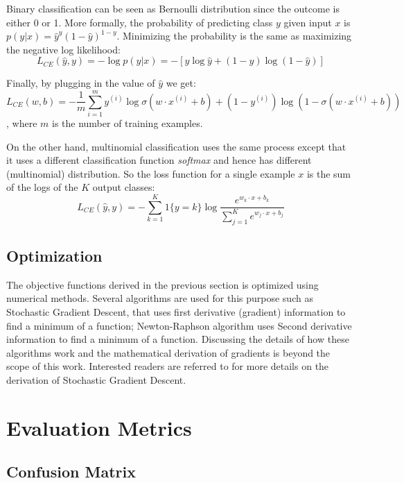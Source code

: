 Binary classification can be seen as Bernoulli distribution since the outcome is either 0 or 1. More formally, the probability of predicting class $y$ given input $x$ is  $p ( y | x ) = \hat { y } ^ { y } ( 1 - \hat { y } ) ^ { 1 - y }$. Minimizing the probability is the same as maximizing the negative log likelihood:
 $$L _ { C E } ( \hat { y } , y ) = - \log p ( y | x ) = - [ y \log \hat { y } + ( 1 - y ) \log ( 1 - \hat { y } ) ]$$

Finally, by plugging in the value of $\hat{y}$ we get:
$$ L _ { C E } ( w , b ) = - \frac { 1 } { m } \sum _ { i = 1 } ^ { m } y ^ { ( i ) } \log \sigma \left( w \cdot x ^ { ( i ) } + b \right) + \left( 1 - y ^ { ( i ) } \right) \log \left( 1 - \sigma \left( w \cdot x ^ { ( i ) } + b \right) \right) $$, where $m$ is the number of training examples.

On the other hand, multinomial classification uses the same process except that it uses a different classification function \emph{softmax} and hence has different (multinomial) distribution. So the loss function for a single example $x$ is the sum of the logs of the $K$ output classes:
$$ L _ { C E } ( \hat { y } , y ) = - \sum _ { k = 1 } ^ { K } 1 \{ y = k \} \log \frac { e ^ { w _ { k } \cdot x + b _ { k } } } { \sum _ { j = 1 } ^ { K } e ^ { w _ { j } \cdot x + b _ { j } } } $$

\subsection{Optimization}

The objective functions derived in the previous section is optimized using numerical methods. Several algorithms are used for this purpose such as Stochastic Gradient Descent, that uses first derivative (gradient) information to find a minimum of a function; Newton-Raphson algorithm uses Second derivative information to find a minimum of a function. Discussing the details of how these algorithms work and the mathematical derivation of gradients is beyond the scope of this work. Interested readers are referred to \citep{jurafsky2014speech} for more details on the derivation of Stochastic Gradient Descent. 

\section{Evaluation Metrics}
\subsection{Confusion Matrix}

